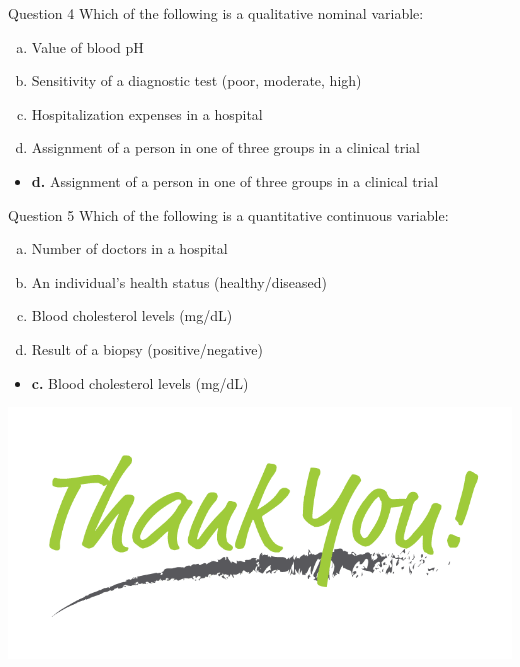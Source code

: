 \documentclass[
  ignorenonframetext,
]{beamer}
\providecommand{\tightlist}{%
  \setlength{\itemsep}{0pt}\setlength{\parskip}{0pt}}\usepackage{longtable,booktabs,array}
\begin{document}
\begin{frame}{Question 4}
\protect\hypertarget{question-4}{}
Which of the following is a qualitative nominal variable:

\begin{enumerate}
[a.]
\tightlist
\item
  Value of blood pH
\item
  Sensitivity of a diagnostic test (poor, moderate, high)
\item
  Hospitalization expenses in a hospital
\item
  Assignment of a person in one of three groups in a clinical trial
\end{enumerate}

\begin{itemize}[<+->]
\tightlist
\item
  {\textbf{d.} Assignment of a person in one of three groups in a
  clinical trial}
\end{itemize}
\end{frame}

\begin{frame}{Question 5}
\protect\hypertarget{question-5}{}
Which of the following is a quantitative continuous variable:

\begin{enumerate}
[a.]
\tightlist
\item
  Number of doctors in a hospital
\item
  An individual's health status (healthy/diseased)
\item
  Blood cholesterol levels (mg/dL)
\item
  Result of a biopsy (positive/negative)
\end{enumerate}

\begin{itemize}[<+->]
\tightlist
\item
  {\textbf{c.} Blood cholesterol levels (mg/dL)}
\end{itemize}
\end{frame}

\begin{frame}{}
\protect\hypertarget{section}{}
\includegraphics{images_slides/thank.png}
\end{frame}
\end{document}

